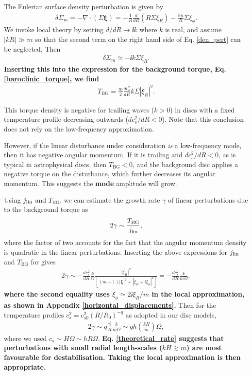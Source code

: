 The Eulerian surface density perturbation is given by
\begin{align}\label{den_pert}
  \delta\Sigma_m = -\nabla\cdot\left(\Sigma\bm{\xi}\right) 
  = -\frac{1}{R}\frac{d}{dR}\left(R\Sigma \xi_R\right) - \frac{\ii m}{R}\Sigma\xi_\phi.  
\end{align}
We invoke local theory by setting $d/dR \to \ii k$ where $k$ is
real, and assume $|kR|\gg m$ so that the second term on the right hand
side of Eq. \ref{den_pert} can be neglected. Then    
\begin{align}
  \delta\Sigma _m  \simeq -\ii k \Sigma \xi_R.
\end{align}
{\bf Inserting this into the expression for the background torque,
  Eq. \ref{baroclinic_torque}, we find}
\begin{align}
  T_\mathrm{BG} = \frac{m}{2}\frac{dc_s^2}{dR}k\Sigma |\xi_R|^2. \label{baroclinic_torque1}
\end{align}


This torque density is negative for trailing waves ($k>0$) in discs with
a fixed temperature profile decreasing outwards ($dc_s^2/dR<0$). Note
that this conclusion does not rely on the low-frequency approximation.    

However, if the linear disturbance under consideration \emph{is} a
low-frequency mode, then it has negative angular
momentum. If it is trailing and $dc_s^2/dR<0$, as is typical
in astrophysical discs, then $T_\mathrm{BG}<0$, and
the background disc applies a negative torque on the disturbance,
which further decreases its angular momentum. This suggests the {\bf
  mode} 
amplitude will grow.  

Using $j_\mathrm{lin}$ and $T_\mathrm{BG}$, we can estimate the 
growth rate $\gamma$ of linear perturbations due to the background
torque as  
\begin{align}
  2\gamma \sim \frac{T_\mathrm{BG}}{j_\mathrm{lin}},
\end{align}
where the factor of two accounts for the fact that the angular momentum
density is quadratic in the linear perturbations. Inserting the above
expressions for $j_\mathrm{lin}$ and $T_\mathrm{BG}$ for gives
\begin{align}\label{theoretical_rate0}
  2\gamma \sim
  -\frac{dc_s^2}{dR}
  \frac{k}{\Omega}\frac{|\xi_R|^2}{\left[(m-1)|\bm{\xi}|^2 + |\xi_R +
      \ii\xi_\phi|^2 \right]} 
  = -\frac{dc_s^2}{dR}
  \frac{k}{m\Omega},
\end{align}
{\bf where the second equality uses $\xi_\phi \simeq
2\ii \xi_R/m$ in the local approximation, as shown in  Appendix
\ref{horizontal_displacements}.} 
Then for the temperature profiles $c_s^2 = c_{s0}^2 (R/R_0)^{-q}$ as
adopted in our disc models,  
\begin{align}
  2\gamma \sim q\frac{c_s^2}{R}\frac{k}{m\Omega} \sim q h
  \left(\frac{kH}{m}\right)\Omega,\label{theoretical_rate}
\end{align}
where we used $c_s\sim H\Omega\sim hR\Omega$. {\bf
  Eq. \ref{theoretical_rate} suggests that perturbations with small
  radial length-scales ($kH\gtrsim m$) are most favourable for
  destabilisation. Taking the local approximation is then
  appropriate.}       


